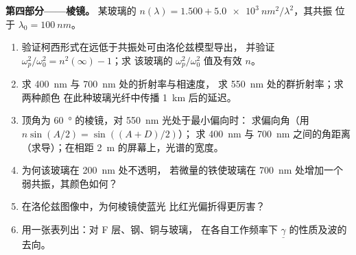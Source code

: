 \begin{problem}
\medskip
\noindent\textbf{第四部分——棱镜。}
某玻璃的 $n(\lambda) = 1.500 + \qty{5.0e3}{nm^2}/\lambda^2$，其共振
位于 $\lambda_0 = \qty{100}{nm}$。
\begin{enumerate}[resume]
  \item 验证柯西形式在远低于共振处可由洛伦兹模型导出，
        并验证 $\omega_p^2/\omega_0^2 = n^2(\infty) - 1$；求
        该玻璃的 $\omega_p^2/\omega_0^2$ 值及有效 $n$。
  \item 求 \qty{400}{nm} 与 \qty{700}{nm} 处的折射率与相速度，
        求 \qty{550}{nm} 处的群折射率；求两种颜色
        在此种玻璃光纤中传播 \qty{1}{km} 后的延迟。
  \item 顶角为 \qty{60}{\degree} 的棱镜，对 \qty{550}{nm} 光处于最小偏向时：
        求偏向角（用 $n\sin(A/2) = \sin((A + D)/2)$）；
        求 \qty{400}{nm} 与 \qty{700}{nm} 之间的角距离（求导）；在相距
        \qty{2}{m} 的屏幕上，光谱的宽度。
  \item 为何该玻璃在 \qty{200}{nm} 处不透明，
        若微量的铁使玻璃在 \qty{700}{nm} 处增加一个弱共振，其颜色如何？
  \item 在洛伦兹图像中，为何棱镜使蓝光
        比红光偏折得更厉害？
  \item 用一张表列出：对 F 层、钢、铜与玻璃，
        在各自工作频率下
        $\underline\gamma$ 的性质及波的去向。
\end{enumerate}
\end{problem}
